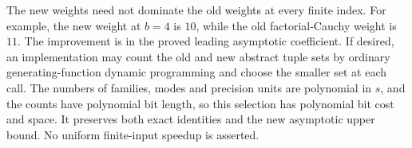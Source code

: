 The new weights need not dominate the old weights at every finite
index. For example, the new weight at $b=4$ is $10$, while the old
factorial-Cauchy weight is $11$. The improvement is in the proved
leading asymptotic coefficient. If desired, an implementation may
count the old and new abstract tuple sets by ordinary generating-function
dynamic programming and choose the smaller set at each call. The numbers
of families, modes and precision units are polynomial in $s$, and the
counts have polynomial bit length, so this selection has polynomial
bit cost and space. It preserves both exact identities and the new
asymptotic upper bound. No uniform finite-input speedup is asserted.
